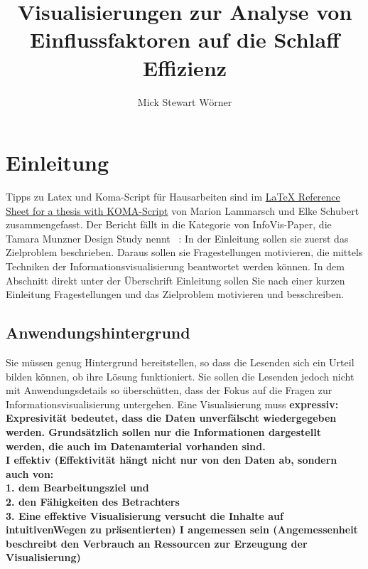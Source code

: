 \documentclass[usegeometry=true]{scrartcl}
\begin{document}
\subject{Projektbericht zum Modul Information Retrieval und Visualisierung Sommersemester 2023}
\title{Visualisierungen zur Analyse von Einflussfaktoren auf die Schlaff Effizienz}
\author{Mick Stewart Wörner}%
\maketitle%

\section{Einleitung}
Tipps zu Latex und Koma-Script für Hausarbeiten sind im \href{http://mirrors.ctan.org/info/latex-refsheet/LaTeX_RefSheet.pdf}{LaTeX Reference Sheet for a thesis with KOMA-Script} von Marion Lammarsch und Elke Schubert zusammengefasst. 
Der Bericht fällt in die Kategorie von InfoVis-Paper, die Tamara Munzner Design Study nennt ~\cite{Munzner2008}: In der Einleitung sollen sie zuerst das Zielproblem beschrieben. Daraus sollen sie Fragestellungen motivieren, die mittels Techniken der Informationsvisualisierung beantwortet werden können. In dem Abschnitt direkt unter der Überschrift Einleitung sollen Sie nach einer kurzen Einleitung Fragestellungen und das Zielproblem motivieren und besschreiben. 

\subsection{Anwendungshintergrund}
Sie müssen genug Hintergrund bereitstellen, so dass die Lesenden sich ein Urteil bilden können, ob ihre Lösung funktioniert. 
Sie sollen die Lesenden jedoch nicht mit Anwendungsdetails so überschütten, dass der Fokus auf die Fragen zur Informationsvisualisierung untergehen. 
Eine Visualisierung muss 
\textbf{expressiv: Expresivität bedeutet, dass die Daten unverfälscht wiedergegeben werden. Grundsätzlich sollen nur die Informationen dargestellt werden, die auch im Datenamterial vorhanden sind.\\
I effektiv (Effektivität hängt nicht nur von den Daten ab, sondern auch von:\\ 1. dem Bearbeitungsziel und \\2. den Fähigkeiten des Betrachters \\
3. Eine effektive Visualisierung versucht die Inhalte auf intuitivenWegen zu präsentierten)
I angemessen sein (Angemessenheit beschreibt den Verbrauch an Ressourcen zur Erzeugung der Visualisierung)}
\end{document}
